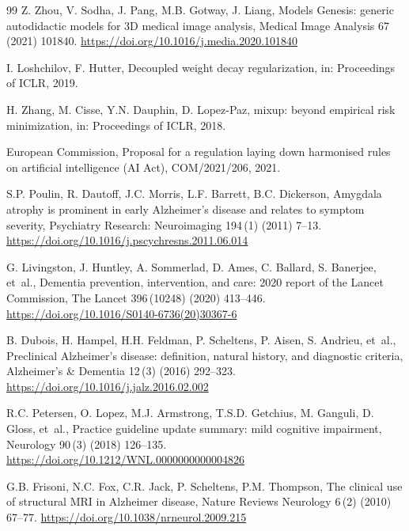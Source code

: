 \documentclass[12pt,a4paper]{article}
\begin{document}
\begin{thebibliography}{99}
Z. Zhou, V. Sodha, J. Pang, M.B. Gotway, J. Liang, Models Genesis: generic autodidactic models for 3D medical image analysis, Medical Image Analysis 67 (2021) 101840.
\url{https://doi.org/10.1016/j.media.2020.101840}

I. Loshchilov, F. Hutter, Decoupled weight decay regularization, in: Proceedings of ICLR, 2019.

H. Zhang, M. Cisse, Y.N. Dauphin, D. Lopez-Paz, mixup: beyond empirical risk minimization, in: Proceedings of ICLR, 2018.

European Commission, Proposal for a regulation laying down harmonised rules on artificial intelligence (AI Act), COM/2021/206, 2021.

S.P. Poulin, R. Dautoff, J.C. Morris, L.F. Barrett, B.C. Dickerson, Amygdala atrophy is prominent in early Alzheimer's disease and relates to symptom severity, Psychiatry Research: Neuroimaging 194\,(1) (2011) 7--13.
\url{https://doi.org/10.1016/j.pscychresns.2011.06.014}


G. Livingston, J. Huntley, A. Sommerlad, D. Ames, C. Ballard, S. Banerjee, et~al., Dementia prevention, intervention, and care: 2020 report of the Lancet Commission, The Lancet 396\,(10248) (2020) 413--446.
\url{https://doi.org/10.1016/S0140-6736(20)30367-6}

B. Dubois, H. Hampel, H.H. Feldman, P. Scheltens, P. Aisen, S. Andrieu, et~al., Preclinical Alzheimer's disease: definition, natural history, and diagnostic criteria, Alzheimer's \& Dementia 12\,(3) (2016) 292--323.
\url{https://doi.org/10.1016/j.jalz.2016.02.002}

R.C. Petersen, O. Lopez, M.J. Armstrong, T.S.D. Getchius, M. Ganguli, D. Gloss, et~al., Practice guideline update summary: mild cognitive impairment, Neurology 90\,(3) (2018) 126--135.
\url{https://doi.org/10.1212/WNL.0000000000004826}

G.B. Frisoni, N.C. Fox, C.R. Jack, P. Scheltens, P.M. Thompson, The clinical use of structural MRI in Alzheimer disease, Nature Reviews Neurology 6\,(2) (2010) 67--77.
\url{https://doi.org/10.1038/nrneurol.2009.215}


\end{thebibliography}
\end{document}
